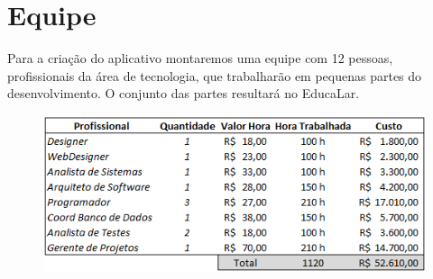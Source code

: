 \chapter[Equipe]{Equipe}

Para a criação do aplicativo montaremos uma equipe com 12 pessoas, profissionais da área de tecnologia, que trabalharão em pequenas partes do desenvolvimento. O conjunto das partes resultará no EducaLar.


\begin{figure}[htb]
	\begin{center}
	    \includegraphics[scale=0.9]{tabelaCustos}
	\end{center}
\end{figure}


